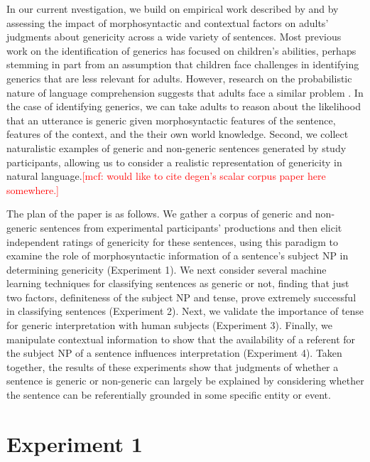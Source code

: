 \documentclass[10pt,letterpaper]{article}
\newcommand{\mcf}[1]{\textcolor{Red}{[mcf: #1]}}
\begin{document}
In our current nvestigation, we build on empirical work described by  and  by assessing the impact of morphosyntactic and contextual factors on adults' judgments about genericity across a wide variety of sentences. Most previous work on the identification of generics has focused on children's abilities, perhaps stemming in part from an assumption that children face challenges in identifying generics that are less relevant for adults. However, research on the probabilistic nature of language comprehension suggests that adults face a similar problem \cite{Levy:2008,Frank:2012}. In the case of identifying generics, we can take adults to reason about the likelihood that an utterance is generic given morphosyntactic features of the sentence, features of the context, and the their own world knowledge. Second, we collect naturalistic examples of generic and non-generic sentences generated by study participants, allowing us to consider a realistic representation of genericity in natural language.\mcf{would like to cite degen's scalar corpus paper here somewhere.}

The plan of the paper is as follows. We gather a corpus of generic and non-generic sentences from experimental participants' productions and then elicit independent ratings of genericity for these sentences, using this paradigm to examine the role of morphosyntactic information of a sentence's subject NP in determining genericity (Experiment 1). We next consider several machine learning techniques for classifying sentences as generic or not, finding that just two factors, definiteness of the subject NP and tense, prove extremely successful in classifying sentences (Experiment 2). Next, we validate the importance of tense for generic interpretation with human subjects (Experiment 3). Finally, we manipulate contextual information to show that the availability of a referent for the subject NP of a sentence influences interpretation (Experiment 4). Taken together, the results of these experiments show that judgments of whether a sentence is generic or non-generic can largely be explained by considering whether the sentence can be referentially grounded in some specific entity or event.

\section{Experiment 1}
\end{document}
